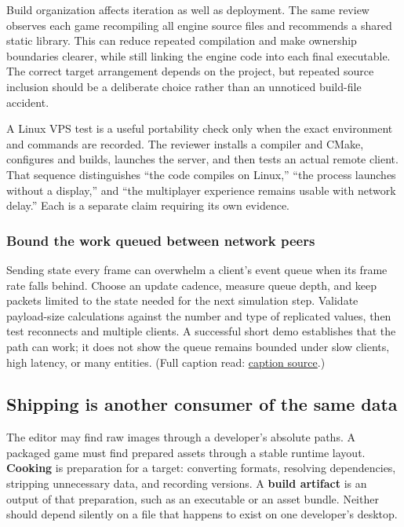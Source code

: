 Build organization affects iteration as well as deployment. The same review observes each game recompiling all engine source files and recommends a shared static library. This can reduce repeated compilation and make ownership boundaries clearer, while still linking the engine code into each final executable. The correct target arrangement depends on the project, but repeated source inclusion should be a deliberate choice rather than an unnoticed build-file accident.

A Linux VPS test is a useful portability check only when the exact environment and commands are recorded. The reviewer installs a compiler and CMake, configures and builds, launches the server, and then tests an actual remote client. That sequence distinguishes ``the code compiles on Linux,'' ``the process launches without a display,'' and ``the multiplayer experience remains usable with network delay.'' Each is a separate claim requiring its own evidence.

\subsubsection{Bound the work queued between network peers}\label{06-engine-ii-ch040-bound-the-work-queued-between-network-peers}

\hypertarget{06-engine-ii-ch040-bound-the-work-queued-between-network-peers}{}

Sending state every frame can overwhelm a client's event queue when its frame rate falls behind. Choose an update cadence, measure queue depth, and keep packets limited to the state needed for the next simulation step. Validate payload-size calculations against the number and type of replicated values, then test reconnects and multiple clients. A successful short demo establishes that the path can work; it does not show the queue remains bounded under slow clients, high latency, or many entities. (Full caption read: \href{https://www.youtube.com/watch?v=hDCnTTyxLl8}{caption source}.)

\subsection{Shipping is another consumer of the same data}\label{06-engine-ii-ch040-shipping-is-another-consumer-of-the-same-data}

\hypertarget{06-engine-ii-ch040-shipping-is-another-consumer-of-the-same-data}{}

The editor may find raw images through a developer's absolute paths. A packaged game must find prepared assets through a stable runtime layout. \textbf{Cooking} is preparation for a target: converting formats, resolving dependencies, stripping unnecessary data, and recording versions. A \textbf{build artifact} is an output of that preparation, such as an executable or an asset bundle. Neither should depend silently on a file that happens to exist on one developer's desktop.

